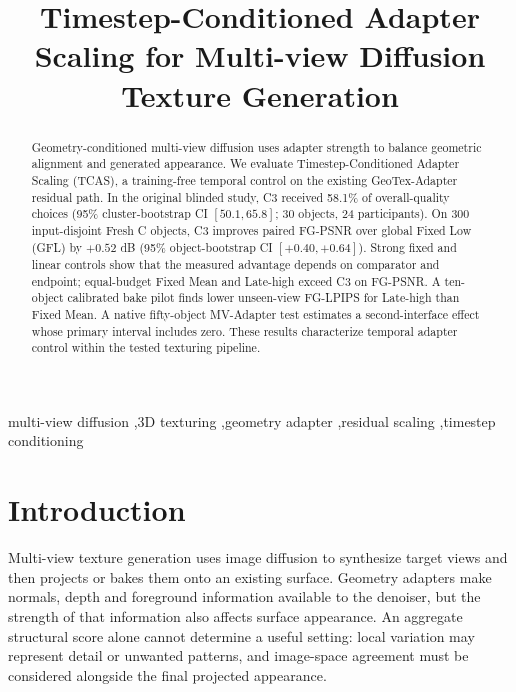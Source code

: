\documentclass[times,twocolumn,final]{elsarticle}
\begin{document}
\begin{frontmatter}

\title{Timestep-Conditioned Adapter Scaling for Multi-view Diffusion Texture Generation}


\begin{abstract}
Geometry-conditioned multi-view diffusion uses adapter strength to balance geometric alignment and generated appearance. We evaluate Timestep-Conditioned Adapter Scaling (TCAS), a training-free temporal control on the existing GeoTex-Adapter residual path. In the original blinded study, C3 received 58.1\% of overall-quality choices (95\% cluster-bootstrap CI $[50.1,65.8]$; 30 objects, 24 participants). On 300 input-disjoint Fresh C objects, C3 improves paired FG-PSNR over global Fixed Low (GFL) by $+0.52$ dB (95\% object-bootstrap CI $[+0.40,+0.64]$). Strong fixed and linear controls show that the measured advantage depends on comparator and endpoint; equal-budget Fixed Mean and Late-high exceed C3 on FG-PSNR. A ten-object calibrated bake pilot finds lower unseen-view FG-LPIPS for Late-high than Fixed Mean. A native fifty-object MV-Adapter test estimates a second-interface effect whose primary interval includes zero. These results characterize temporal adapter control within the tested texturing pipeline.
\end{abstract}

\begin{keyword}
\KWD
multi-view diffusion \sep 3D texturing \sep geometry adapter \sep residual scaling \sep timestep conditioning
\end{keyword}

\end{frontmatter}

\linenumbers

\section{Introduction}
\label{sec:intro}

Multi-view texture generation uses image diffusion to synthesize target views and then projects or bakes them onto an existing surface. Geometry adapters make normals, depth and foreground information available to the denoiser, but the strength of that information also affects surface appearance. An aggregate structural score alone cannot determine a useful setting: local variation may represent detail or unwanted patterns, and image-space agreement must be considered alongside the final projected appearance.
\end{document}
